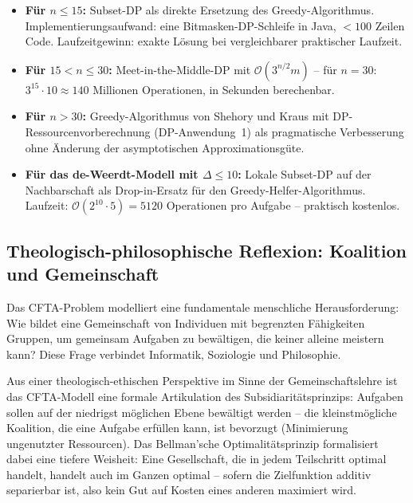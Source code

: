 ﻿\documentclass[a4paper,12pt]{article}
\theoremstyle{definition}
\begin{document}
\begin{itemize}
    \item \textbf{F\"{u}r $n \leq 15$:} Subset-DP als direkte Ersetzung des
          Greedy-Algorithmus. Implementierungsaufwand: eine Bitmasken-DP-Schleife
          in Java, $< 100$ Zeilen Code. Laufzeitgewinn: exakte L\"{o}sung bei
          vergleichbarer praktischer Laufzeit.
    \item \textbf{F\"{u}r $15 < n \leq 30$:} Meet-in-the-Middle-DP mit
          $\mathcal{O}(3^{n/2} m)$ -- f\"{u}r $n = 30$: $3^{15} \cdot 10 \approx 140$
          Millionen Operationen, in Sekunden berechenbar.
    \item \textbf{F\"{u}r $n > 30$:} Greedy-Algorithmus von Shehory und Kraus
          mit DP-Ressourcenvorberechnung (DP-Anwendung~1) als pragmatische
          Verbesserung ohne \"{A}nderung der asymptotischen Approximationsg\"{u}te.
    \item \textbf{F\"{u}r das de-Weerdt-Modell mit $\Delta \leq 10$:}
          Lokale Subset-DP auf der Nachbarschaft als Drop-in-Ersatz f\"{u}r
          den Greedy-Helfer-Algorithmus. Laufzeit: $\mathcal{O}(2^{10} \cdot 5) = 5120$
          Operationen pro Aufgabe -- praktisch kostenlos.
\end{itemize}

\subsection{Theologisch-philosophische Reflexion: Koalition und Gemeinschaft}

Das CFTA-Problem modelliert eine fundamentale menschliche Herausforderung:
Wie bildet eine Gemeinschaft von Individuen mit begrenzten F\"{a}higkeiten
Gruppen, um gemeinsam Aufgaben zu bew\"{a}ltigen, die keiner alleine
meistern kann? Diese Frage verbindet Informatik, Soziologie und Philosophie.

Aus einer theologisch-ethischen Perspektive im Sinne der Gemeinschaftslehre
ist das CFTA-Modell eine formale Artikulation des Subsidiarit\"{a}tsprinzips:
Aufgaben sollen auf der niedrigst m\"{o}glichen Ebene bew\"{a}ltigt werden --
die kleinstm\"{o}gliche Koalition, die eine Aufgabe erf\"{u}llen kann, ist
bevorzugt (Minimierung ungenutzter Ressourcen). Das Bellman'sche
Optimalit\"{a}tsprinzip formalisiert dabei eine tiefere Weisheit: Eine Gesellschaft,
die in jedem Teilschritt optimal handelt, handelt auch im Ganzen optimal --
sofern die Zielfunktion additiv separierbar ist, also kein Gut auf Kosten
eines anderen maximiert wird.
\end{document}
